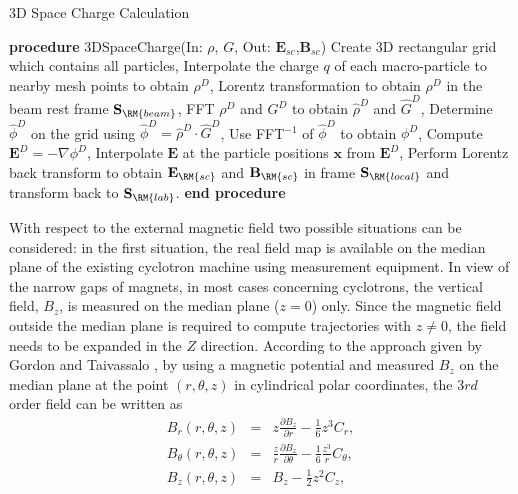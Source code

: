 \documentclass[aps,prstab,twocolumn,superscriptaddress,showpacs]{revtex4}
\newcommand{\bs}[1]{\mathbf #1}
\begin{document}
\begin{algorithm}
  \caption{3D Space Charge Calculation} 
  \label{alg1:sc3d}
  \begin{algorithmic}[1]
    \STATE \textbf{procedure} 3DSpaceCharge(In: $\rho$, $G$, Out: $\bs{E_{sc}}$,$\bs{B_{sc}}$)
       \STATE Create 3D rectangular grid which contains all particles, %
       \STATE Interpolate the charge $q$ of each macro-particle to nearby mesh points to obtain $\rho^D$, 
       \STATE Lorentz transformation to obtain $\rho^D$ in the beam rest frame $\bs{S}_{\RM{beam}}$,
       \STATE FFT $\rho^D$ and $G^D$ to obtain $\widehat{\rho}^D$ and $\widehat{G}^D$,
       \STATE Determine $\widehat{\phi}^D$ on the grid using $\widehat{\phi}^D = \widehat{\rho}^D \cdot \widehat{G}^D$,
       \STATE Use FFT$^{-1}$ of $\widehat{\phi }^D$ to obtain $\phi^D$,
       \STATE Compute $\bs{E}^D= -\nabla \phi^D$,
       \STATE Interpolate $\bs{E}$ at the particle positions $\bs{x}$ from $\bs{E}^D$,
       \STATE Perform Lorentz back transform to obtain $\bs{E_{\RM{sc}}}$ and $\bs{B_{\RM{sc}}}$ in  frame $\bs{S}_{\RM{local}}$ and transform back  to $\bs{S}_{\RM{lab}}$.
       \STATE \textbf{end procedure}
  \end{algorithmic}
\end{algorithm}
With respect to the external magnetic field two possible situations can be considered: 
in the first situation, the real field map is available on the median plane of the existing cyclotron machine using measurement equipment.
In view of the narrow gaps of magnets, in most cases concerning cyclotrons, the vertical field, $B_z$, is measured on the median plane ($z=0$) only.
Since the magnetic field outside the median plane is required to compute trajectories with $z \neq 0$, the field needs to be expanded in the $Z$ direction. 
According to the approach given by Gordon and Taivassalo \cite{Gordon:2}, by using a magnetic potential and measured $B_z$ on the median plane
at the point $(r,\theta, z)$ in cylindrical polar coordinates, the 3$rd$ order field can be written as    
\begin{eqnarray}\label{eq:Bfield}
  B_r(r,\theta, z) & = & z\frac{\partial B_z}{\partial r}-\frac{1}{6}z^3 C_r, \nonumber\\    
  B_\theta(r,\theta, z) & = & \frac{z}{r}\frac{\partial B_z}{\partial \theta}-\frac{1}{6}\frac{z^3}{r} C_{\theta}, \\     
  B_z(r,\theta, z) & = & B_z-\frac{1}{2}z^2 C_z,  \nonumber    
\end{eqnarray}
\end{document}

